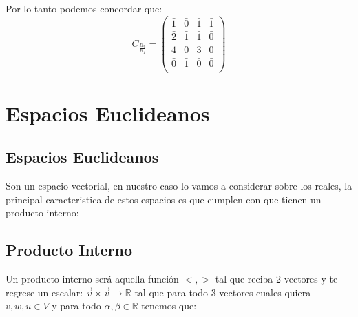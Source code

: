 \documentclass[12pt]{report}							    %
\begin{document}
        Por lo tanto podemos concordar que:
        \begin{equation*}
            C_{\frac{B_2}{B_1}} = 
            \begin{pmatrix}
                \bar{1} & \bar{0} & \bar{1} & \bar{1} \\
                \bar{2} & \bar{1} & \bar{1} & \bar{0} \\
                \bar{4} & \bar{0} & \bar{3} & \bar{0} \\
                \bar{0} & \bar{1} & \bar{0} & \bar{0} \\
            \end{pmatrix}
        \end{equation*}



\chapter{Espacios Euclideanos}
    \clearpage

    \section{Espacios Euclideanos}
        Son un espacio vectorial, en nuestro caso lo vamos a considerar sobre los reales, la principal caracteristica de estos espacios es que cumplen con que tienen un producto interno:


    \clearpage
    \section{Producto Interno}
        Un producto interno será aquella función $<,>$ tal que reciba 2 vectores y
        te regrese un escalar: $\vec v \times \vec v \to \mathbb{R}$ tal que para
        todo 3 vectores cuales quiera $v, w, u \in V$ y para todo
        $\alpha , \beta \in  \mathbb{R} $ tenemos que:
\end{document}
